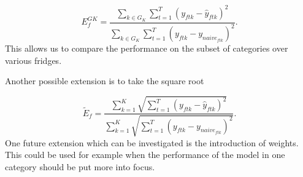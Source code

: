 \begin{equation}
E^{GK}_{f}=\frac{\sum_{k \in G_K}\sum_{t=1}^T(y_{ftk}-\hat{y}_{ftk})^2}{\sum_{k \in G_K}\sum_{t=1}^T(y_{ftk}-y_{naive_{ftk}})^2}.
\label{eq: Error Measure Subsets}
\end{equation}
%
This allows us to compare the performance on the subset of categories over various fridges. 

Another possible extension is to take the square root

\begin{equation}
\widetilde{E}_f=\frac{\sum_{k=1}^{K}\sqrt{\sum_{t=1}^T(y_{ftk}-\hat{y}_{ftk})^2}}{\sum_{k=1}^{K}\sqrt{\sum_{t=1}^T(y_{ftk}-y_{naive_{ftk}})^2}}.
\label{eq: Error Measure Sqrt} 
\end{equation}
%
One future extension which can be investigated is the introduction of weights. This could be used for example when the performance of the model in one category should be put more into focus. 